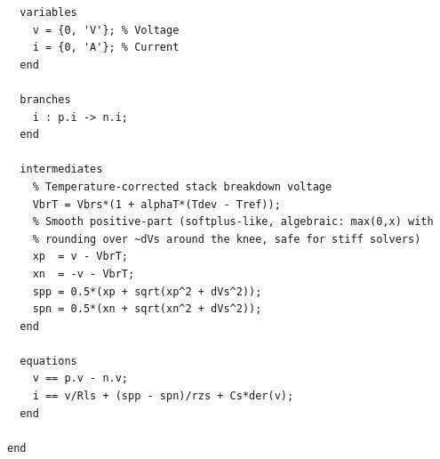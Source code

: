\documentclass[11pt,a4paper]{article}
\begin{document}
\begin{lstlisting}
  variables
    v = {0, 'V'}; % Voltage
    i = {0, 'A'}; % Current
  end

  branches
    i : p.i -> n.i;
  end

  intermediates
    % Temperature-corrected stack breakdown voltage
    VbrT = Vbrs*(1 + alphaT*(Tdev - Tref));
    % Smooth positive-part (softplus-like, algebraic: max(0,x) with
    % rounding over ~dVs around the knee, safe for stiff solvers)
    xp  = v - VbrT;
    xn  = -v - VbrT;
    spp = 0.5*(xp + sqrt(xp^2 + dVs^2));
    spn = 0.5*(xn + sqrt(xn^2 + dVs^2));
  end

  equations
    v == p.v - n.v;
    i == v/Rls + (spp - spn)/rzs + Cs*der(v);
  end

end
\end{lstlisting}
\end{document}
